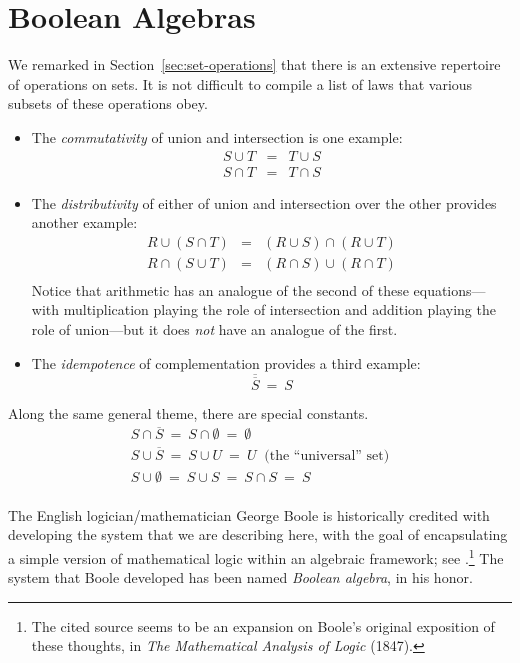 \section{Boolean Algebras}
\label{sec:Boolean-Algebra}

We remarked in Section~\ref{sec:set-operations} that there is an
extensive repertoire of operations on sets.  It is not difficult to
compile a list of laws that various subsets of these operations obey.
\begin{itemize}
\item
The {\em commutativity} of union and intersection is one example:
\begin{eqnarray*}
S \cup T & = & T \cup S \\
S \cap T & = & T \cap S
\end{eqnarray*}

\item
The {\em distributivity} of either of union and intersection over the
other provides another example:
\begin{eqnarray*}
R \cup (S \cap T) & = & (R \cup S) \cap (R \cup T) \\
R \cap (S \cup T) & = & (R \cap S) \cup (R \cap T) \\
\end{eqnarray*}
Notice that arithmetic has an analogue of the second of these
equations---with multiplication playing the role of intersection and
addition playing the role of union---but it does {\em not} have an
analogue of the first.

\item
The {\em idempotence} of complementation provides a third example:
\[ \overline{\overline{S}} \ = \ S \]
\end{itemize}
Along the same general theme, there are special constants.
\[
\begin{array}{l}
S \cap \overline{S} \ = \ S \cap \emptyset \ = \ \emptyset \\
S \cup \overline{S} \ = \ S \cup U \ = \ U \ \mbox{ (the ``universal'' set)} \\
S \cup \emptyset \ = \ S \cup S \ = \ S \cap S \ = \ S \\
\end{array}
\]

The English logician/mathematician George Boole 
is historically credited with developing the system that we are
describing here, with the goal of encapsulating a simple version of
mathematical logic within an algebraic framework; see
\cite{Boole54}.\footnote{The cited source seems to be an expansion on
  Boole's original exposition of these thoughts, in {\it The
    Mathematical Analysis of Logic} (1847).}  The system that Boole
developed has been named {\it Boolean algebra}, in his honor.

